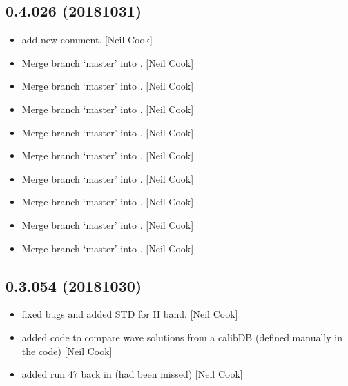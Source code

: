 \documentclass[a4paper,10pt,english]{report}
\begin{document}
\subsection{0.4.026 (2018\sphinxhyphen{}10\sphinxhyphen{}31)}
\label{\detokenize{misc/changelog:id294}}\begin{itemize}
\item {} 
 \sphinxhyphen{} add new comment. {[}Neil Cook{]}

\item {} 
Merge branch ‘master’ into . {[}Neil Cook{]}

\item {} 
Merge branch ‘master’ into . {[}Neil Cook{]}

\item {} 
Merge branch ‘master’ into . {[}Neil Cook{]}

\item {} 
Merge branch ‘master’ into . {[}Neil Cook{]}

\item {} 
Merge branch ‘master’ into . {[}Neil Cook{]}

\item {} 
Merge branch ‘master’ into . {[}Neil Cook{]}

\item {} 
Merge branch ‘master’ into . {[}Neil Cook{]}

\item {} 
Merge branch ‘master’ into . {[}Neil Cook{]}

\item {} 
Merge branch ‘master’ into . {[}Neil Cook{]}

\end{itemize}


\subsection{0.3.054 (2018\sphinxhyphen{}10\sphinxhyphen{}30)}
\label{\detokenize{misc/changelog:id295}}\begin{itemize}
\item {} 
 \sphinxhyphen{} fixed bugs and added STD for H band. {[}Neil Cook{]}

\item {} 
 \sphinxhyphen{} added code to compare wave solutions from a calibDB
(defined manually in the code) {[}Neil Cook{]}

\item {} 
 \sphinxhyphen{} added run 47 back in (had been missed) {[}Neil Cook{]}

\end{itemize}
\end{document}
